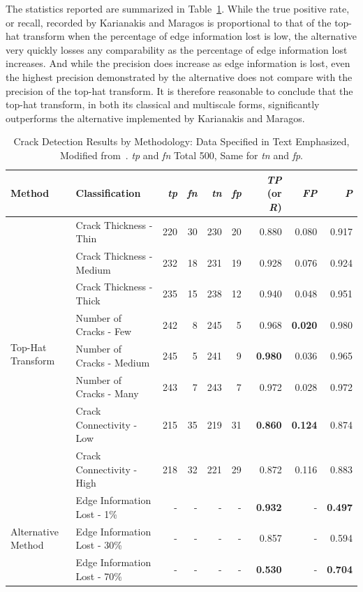 \documentclass{sig-alternate}
\begin{document}
The statistics reported are summarized in Table~\ref{results table}. While the true positive rate, or recall, recorded by Karianakis and Maragos is proportional to that of the top-hat transform when the percentage of edge information lost is low, the alternative very quickly losses any comparability as the percentage of edge information lost increases. And while the precision does increase as edge information is lost, even the highest precision demonstrated by the alternative does not compare with the precision of the top-hat transform. It is therefore reasonable to conclude that the top-hat transform, in both its classical and multiscale forms, significantly outperforms the alternative implemented by Karianakis and Maragos.
\begin{table}
\centering
\begin{tabular}{|l|l|r|r|r|r|r|r|r|}
\hline
\textbf{Method} & \textbf{Classification} & \textbf{\textit{tp}} & \textbf{\textit{fn}} & \textbf{\textit{tn}} & \textbf{\textit{fp}} & \textbf{\textit{TP} (or \textit{R})} & \textbf{\textit{FP}} & \textbf{\textit{P}}\\ \hline
\multirow{8}{*}{Top-Hat Transform}
& Crack Thickness - Thin & 220 & 30 & 230 & 20 & 0.880 & 0.080 & 0.917\\ \cline{2-9}
& Crack Thickness - Medium & 232 & 18 & 231 & 19 & 0.928 & 0.076 & 0.924\\ \cline{2-9}
& Crack Thickness - Thick & 235 & 15 & 238 & 12 & 0.940 & 0.048 & 0.951\\ \cline{2-9}
& Number of Cracks - Few & 242 & 8 & 245 & 5 & 0.968 & \textbf{0.020} & 0.980\\ \cline{2-9}
& Number of Cracks - Medium & 245 & 5 & 241 & 9 & \textbf{0.980} & 0.036 & 0.965\\ \cline{2-9}
& Number of Cracks - Many & 243 & 7 & 243 & 7 & 0.972 & 0.028 & 0.972\\ \cline{2-9}
& Crack Connectivity - Low & 215 & 35 & 219 & 31 & \textbf{0.860} & \textbf{0.124} & 0.874\\ \cline{2-9}
& Crack Connectivity - High & 218 & 32 & 221 & 29 & 0.872 & 0.116 & 0.883\\ \hline
\multirow{3}{*}{Alternative Method}
& Edge Information Lost - 1\% & - & - & - & - & \textbf{0.932} & - & \textbf{0.497}\\ \cline{2-9}
& Edge Information Lost - 30\% & - & - & - & - & 0.857 & - & 0.594\\ \cline{2-9}
& Edge Information Lost - 70\% & - & - & - & - & \textbf{0.530} & - & \textbf{0.704}\\ \hline
\end{tabular}
\caption{Crack Detection Results by Methodology: Data Specified in Text Emphasized, Modified from~\cite{Statistics:2013, Theran:2013}. \textit{tp} and \textit{fn} Total 500, Same for \textit{tn} and \textit{fp}.}
\label{results table}
\end{table}
\end{document}

